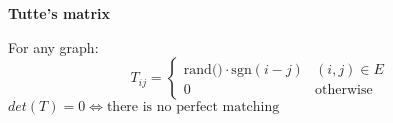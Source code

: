 \textbf{Tutte's matrix}

For any graph:
\[
T_{ij} = \begin{cases} 
      \text{rand()} \cdot \text{sgn}(i - j) & (i, j) \in E \\
      0 & \text{otherwise}
   \end{cases}
\]
$det(T) = 0 \iff \text{there is no perfect matching}$
